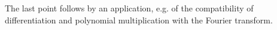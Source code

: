 %
The last point follows by an application, e.g. of the compatibility of differentiation and polynomial multiplication with the Fourier transform.




